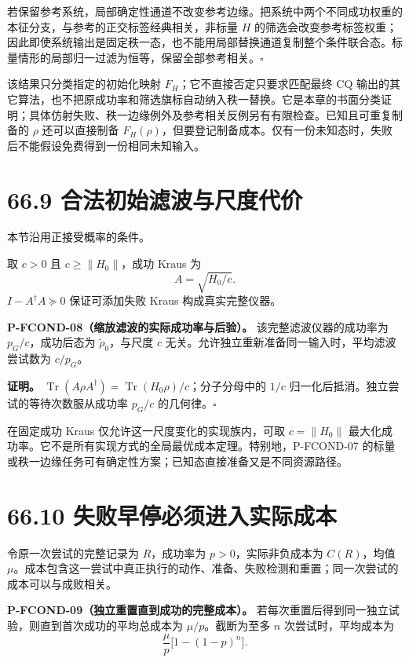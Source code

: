 \documentclass[
  11pt,
  oneside]{book}
\begin{document}
若保留参考系统，局部确定性通道不改变参考边缘。把系统中两个不同成功权重的本征分支，与参考的正交标签经典相关，非标量
\(H\)
的筛选会改变参考标签权重；因此即使系统输出是固定秩一态，也不能用局部替换通道复制整个条件联合态。标量情形的局部归一过滤为恒等，保留全部参考相关。\(\square\)

该结果只分类指定的初始化映射 \(F_H\)；它不直接否定只要求匹配最终 CQ
输出的其它算法，也不把原成功率和筛选旗标自动纳入秩一替换。它是本章的书面分类证明；具体仿射失败、秩一边缘例外及参考相关反例另有有限检查。已知且可重复制备的
\(\rho\) 还可以直接制备
\(F_H(\rho)\)，但要登记制备成本。仅有一份未知态时，失败后不能假设免费得到一份相同未知输入。

\section{66.9 合法初始滤波与尺度代价}

本节沿用正接受概率的条件。

取 \(c>0\) 且 \(c\ge\|H_0\|\)，成功 Kraus 为 \[
A=\sqrt{H_0/c}.
\] \(I-A^{\dagger}A\succeq0\) 保证可添加失败 Kraus 构成真实完整仪器。

\protect\hypertarget{p-fcond-08}{}{}
\textbf{P-FCOND-08（缩放滤波的实际成功率与后验）。}
该完整滤波仪器的成功率为 \(p_G/c\)，成功后态为
\(\widetilde\rho_0\)，与尺度 \(c\)
无关。允许独立重新准备同一输入时，平均滤波尝试数为 \(c/p_G\)。

\textbf{证明。}
\(\operatorname{Tr}(A\rho A^{\dagger})=\operatorname{Tr}(H_0\rho)/c\)；分子分母中的
\(1/c\) 归一化后抵消。独立尝试的等待次数服从成功率 \(p_G/c\)
的几何律。\(\square\)

在固定成功 Kraus 仅允许这一尺度变化的实现族内，可取 \(c=\|H_0\|\)
最大化成功率。它不是所有实现方式的全局最优成本定理。特别地，P-FCOND-07
的标量或秩一边缘任务可有确定性方案；已知态直接准备又是不同资源路径。

\section{66.10 失败早停必须进入实际成本}

令原一次尝试的完整记录为 \(R\)，成功率为 \(p>0\)，实际非负成本为
\(C(R)\)，均值
\(\mu\)。成本包含这一尝试中真正执行的动作、准备、失败检测和重置；同一次尝试的成本可以与成败相关。

\protect\hypertarget{p-fcond-09}{}{}
\textbf{P-FCOND-09（独立重置直到成功的完整成本）。}
若每次重置后得到同一独立试验，则直到首次成功的平均总成本为
\(\mu/p\)。截断为至多 \(n\) 次尝试时，平均成本为 \[
\frac{\mu}{p}\bigl[1-(1-p)^n\bigr].
\]
\end{document}

